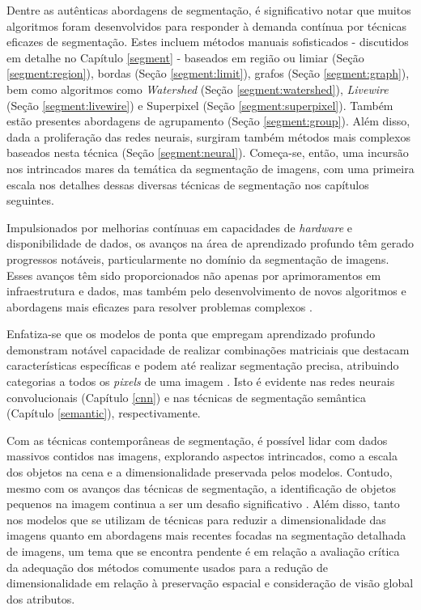 Dentre as autênticas abordagens de segmentação, é significativo notar que muitos algoritmos foram desenvolvidos para responder à demanda contínua por técnicas eficazes de segmentação. Estes incluem métodos manuais sofisticados - discutidos em detalhe no Capítulo \ref{segment} - baseados em região ou limiar (Seção \ref{segment:region}), bordas (Seção \ref{segment:limit}), grafos (Seção \ref{segment:graph}), bem como algoritmos como \textit{Watershed} (Seção \ref{segment:watershed}), \textit{Livewire} (Seção \ref{segment:livewire}) e Superpixel (Seção \ref{segment:superpixel}). Também estão presentes abordagens de agrupamento (Seção \ref{segment:group}). Além disso, dada a proliferação das redes neurais, surgiram também métodos mais complexos baseados nesta técnica (Seção \ref{segment:neural}). Começa-se, então, uma incursão nos intrincados mares da temática da segmentação de imagens, com uma primeira escala nos detalhes dessas diversas técnicas de segmentação nos capítulos seguintes.

Impulsionados por melhorias contínuas em capacidades de \textit{hardware} e disponibilidade de dados, os avanços na área de aprendizado profundo têm gerado progressos notáveis, particularmente no domínio da segmentação de imagens. Esses avanços têm sido proporcionados não apenas por aprimoramentos em infraestrutura e dados, mas também pelo desenvolvimento de novos algoritmos e abordagens mais eficazes para resolver problemas complexos \citep{Szegedy2015}.

Enfatiza-se que os modelos de ponta que empregam aprendizado profundo demonstram notável capacidade de realizar combinações matriciais que destacam características específicas e podem até realizar segmentação precisa, atribuindo categorias a todos os \textit{pixels} de uma imagem \citep{Minaee2021}. Isto é evidente nas redes neurais convolucionais (Capítulo \ref{cnn}) e nas técnicas de segmentação semântica (Capítulo \ref{semantic}), respectivamente.

Com as técnicas contemporâneas de segmentação, é possível lidar com dados massivos contidos nas imagens, explorando aspectos intrincados, como a escala dos objetos na cena e a dimensionalidade preservada pelos modelos. Contudo, mesmo com os avanços das técnicas de segmentação, a identificação de objetos pequenos na imagem continua a ser um desafio significativo \citep{Sang2023Small-ObjectAttention, Su2021Small-scaleFusion}. Além disso, tanto nos modelos que se utilizam de técnicas para reduzir a dimensionalidade das imagens quanto em abordagens mais recentes focadas na segmentação detalhada de imagens, um tema que se encontra pendente é em relação a avaliação crítica da adequação dos métodos comumente usados para a redução de dimensionalidade em relação à preservação espacial e consideração de visão global dos atributos.

